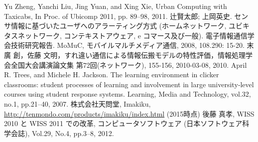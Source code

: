 \begin{thebibliography}{99}

       Yu Zheng, Yanchi Liu, Jing Yuan, and Xing Xie, Urban Computing with Taxicabs, In Proc. of Ubicomp 2011, pp. 89--98, 2011.
 辻賢太郎; 上岡英史. センサ情報に基づいたユーザへのアラーティング方式 (ホームネットワーク, ユビキタスネットワーク, コンテキストアウェア, e コマース及び一般). 電子情報通信学会技術研究報告. MoMuC, モバイルマルチメディア通信, 2008, 108.290: 15-20.
  末廣 創，佐藤 文明，すれ違い通信による情報伝搬モデルの特性評価，情報処理学会全国大会講演論文集 第72回(ネットワーク), 155-156, 2010-03-08, 2010.
     April R. Trees, and Michele H. Jackson. The learning environment in clicker classrooms: student processes of learning and involvement in large university‐level courses using student response systems. Learning, Media and Technology, vol.32, no.1, pp.21--40, 2007.
     株式会社天問堂, Imakiku, \url{http://tenmondo.com/products/imakiku/index.html} (2015時点)
     後藤 真孝, WISS 2010 と WISS 2011 での改革, コンピュータソフトウェア (日本ソフトウェア科学会誌), Vol.29, No.4, pp.3--8, 2012.


\end{thebibliography}
